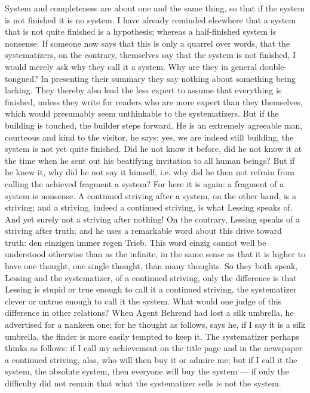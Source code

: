 \documentclass[12pt,a4paper,openany]{book}
\newcommand{\opage}[1]{\marginnote{\footnotesize\textit{[#1]}}}
\begin{document}
System and completeness are about one and the same thing, so that if the system is
not finished it is no system. I have already reminded elsewhere that a system that
is not quite finished is a hypothesis; whereas a half-finished system is nonsense.
If someone now says that this is only a quarrel over words, that the systematizers,
on the contrary, themselves say that the system is not finished, I would merely ask
why they call it a system. Why are they in general double-tongued? In presenting
their summary they say nothing about something being lacking. They thereby also
lead the less expert to assume that everything is finished, unless they write for
readers who are more expert than they themselves, which would presumably seem
unthinkable to the systematizers. But if the building is touched, the builder steps
forward. He is an extremely agreeable man, courteous and kind to the visitor, he
says: yes, we are indeed still building, the system is not yet quite finished. Did
he not know it before, did he not know it at the time when he sent out his
beatifying invitation to all human beings? But if he knew it, why did he not say
it himself, i.e. why did he then not refrain from calling the achieved fragment a
system? For here it is again: a fragment of a system is nonsense. A continued
striving after a system, on the other hand, is a striving; and a striving, indeed a
continued striving, is what Lessing speaks of. And yet surely not a striving after
nothing! On the contrary, Lessing speaks of a striving after truth; and he uses a
\setcounter{footnote}{0}%
\opage{170}remarkable word about this drive toward truth: den einzigen immer regen Trieb. This
word einzig cannot well be understood otherwise than as the infinite, in the same
sense as that it is higher to have one thought, one single thought, than many
thoughts. So they both speak, Lessing and the systematizer, of a continued striving,
only the difference is that Lessing is stupid or true enough to call it a continued
striving, the systematizer clever or untrue enough to call it the system. What would
one judge of this difference in other relations? When Agent Behrend had lost a silk
umbrella, he advertised for a nankeen one; for he thought as follows, says he, if I
say it is a silk umbrella, the finder is more easily tempted to keep it. The
systematizer perhaps thinks as follows: if I call my achievement on the title page
and in the newspaper a continued striving, alas, who will then buy it or admire me;
but if I call it the system, the absolute system, then everyone will buy the system
--- if only the difficulty did not remain that what the systematizer sells is not the
system.
\end{document}
